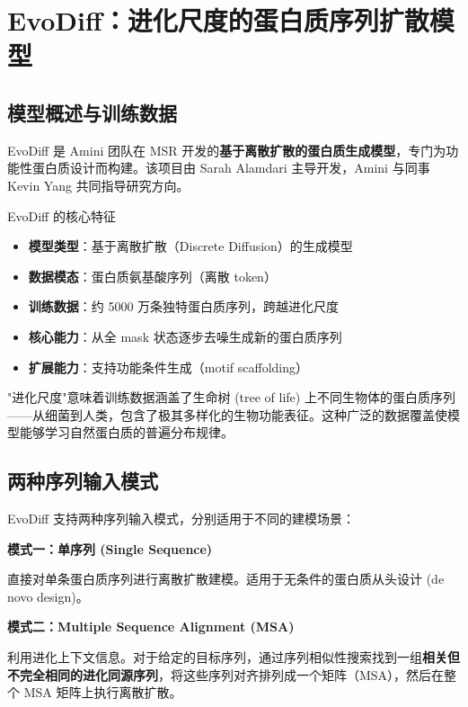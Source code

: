 \section{EvoDiff：进化尺度的蛋白质序列扩散模型}

\subsection{模型概述与训练数据}

EvoDiff 是 Amini 团队在 MSR 开发的\textbf{基于离散扩散的蛋白质生成模型}，专门为功能性蛋白质设计而构建。该项目由 Sarah Alamdari 主导开发，Amini 与同事 Kevin Yang 共同指导研究方向。

\begin{importantbox}{EvoDiff 的核心特征}
\begin{itemize}
    \item \textbf{模型类型}：基于离散扩散（Discrete Diffusion）的生成模型
    \item \textbf{数据模态}：蛋白质氨基酸序列（离散 token）
    \item \textbf{训练数据}：约 5000 万条独特蛋白质序列，跨越进化尺度
    \item \textbf{核心能力}：从全 mask 状态逐步去噪生成新的蛋白质序列
    \item \textbf{扩展能力}：支持功能条件生成（motif scaffolding）
\end{itemize}
\end{importantbox}

"进化尺度"意味着训练数据涵盖了生命树 (tree of life) 上不同生物体的蛋白质序列——从细菌到人类，包含了极其多样化的生物功能表征。这种广泛的数据覆盖使模型能够学习自然蛋白质的普遍分布规律。

\subsection{两种序列输入模式}

EvoDiff 支持两种序列输入模式，分别适用于不同的建模场景：

\textbf{模式一：单序列 (Single Sequence)}

直接对单条蛋白质序列进行离散扩散建模。适用于无条件的蛋白质从头设计 (de novo design)。

\textbf{模式二：Multiple Sequence Alignment (MSA)}

利用进化上下文信息。对于给定的目标序列，通过序列相似性搜索找到一组\textbf{相关但不完全相同的进化同源序列}，将这些序列对齐排列成一个矩阵（MSA），然后在整个 MSA 矩阵上执行离散扩散。

